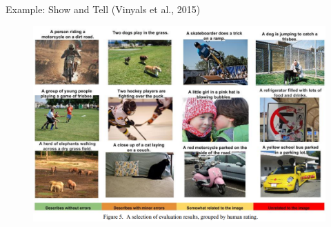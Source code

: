 \begin{frame}[allowframebreaks]{Example: Show and Tell (Vinyals et al., 2015)}
\begin{figure}
    \end{figure}
\framebreak
    \begin{figure}
        \centering
        \includegraphics[width=1.08\textwidth,height=0.9\textheight,keepaspectratio]{images/vision+text/show-and-tell-result.png}
    \end{figure}
\end{frame}

